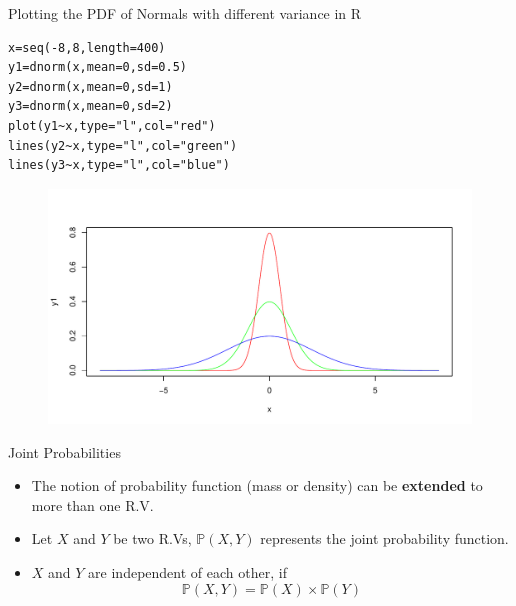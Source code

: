 \documentclass[handout]{beamer}
\begin{document}
\begin{frame}[fragile]{Plotting the PDF of Normals with different variance in R}
\scriptsize{
\begin{verbatim}
x=seq(-8,8,length=400)
y1=dnorm(x,mean=0,sd=0.5)
y2=dnorm(x,mean=0,sd=1) 
y3=dnorm(x,mean=0,sd=2)
plot(y1~x,type="l",col="red")
lines(y2~x,type="l",col="green")
lines(y3~x,type="l",col="blue")
\end{verbatim}
}
 \begin{figure}[h!]
	\centering
	\includegraphics[scale=0.35]{pics/normplot.pdf}
\end{figure}



\end{frame}




\begin{frame}{Joint Probabilities}
\scriptsize{
\begin{itemize}
 \item The notion of probability function (mass or density) can be \textbf{extended} to more than one R.V.  
 \item Let $X$ and $Y$ be two R.Vs, $\mathbb{P}(X,Y)$ represents the joint probability function.
 \item $X$ and $Y$ are independent of each other, if
 \begin{displaymath}
\mathbb{P}(X,Y)=\mathbb{P}(X)\times \mathbb{P}(Y)                                                     \end{displaymath}

\end{itemize}




} 
\end{frame}
\end{document}
